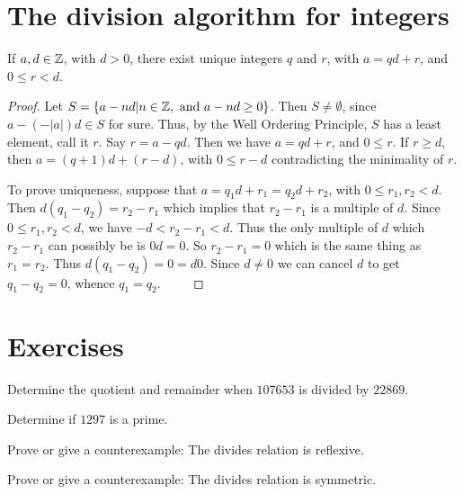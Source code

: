 \section{The division algorithm for integers}
\begin{thm} 
If $a,d\in \mathbb{Z}$, with $d>0$, there exist
unique integers $q$ and $r$, with $a=qd+r$, and $0\leq r<d$.

\end{thm}
\begin{proof}
Let $S=\{a-nd|n\in \mathbb{Z}, {\rm {~and~}} a-nd \geq 0\}$. Then $S\neq \emptyset$, since $a-(-|a|)d\in S$ for sure.
Thus, by the Well Ordering Principle, $S$ has a least element, call it $r$. Say $r=a-qd$. Then 
we have $a=qd+r$, and $0\leq r$. If $r\geq d$, then $a=(q+1)d+(r-d)$, with $0\leq r-d$ contradicting
the minimality of $r$. 

To prove uniqueness, suppose that $a=q_1d+r_1=q_2d+r_2$, with $0\leq r_1,r_2<d$. Then 
$d(q_1-q_2)=r_2-r_1$ which implies that $r_2-r_1$ is a multiple of $d$. Since $0\leq r_1,r_2<d$,
we have $-d<r_2-r_1<d$. Thus the only multiple of $d$ which $r_2-r_1$ can possibly be is $0d=0$.
So $r_2-r_1=0$ which is the same thing as $r_1=r_2$. Thus $d(q_1-q_2)=0=d0$. Since $d\neq 0$ we
can cancel $d$ to get $q_1-q_2=0$, whence $q_1=q_2$.$\quad$ $\;$\
\end{proof}


\clearpage

\section{Exercises}

\begin{exer}
  Determine the quotient and remainder when $107653$ is
divided by $22869$.
\end{exer}

\begin{exer}
Determine if $1297$ is a prime.
\end{exer}

\begin{exer}
Prove or give a counterexample: The divides relation is reflexive.
\end{exer}

\begin{exer}
Prove or give a counterexample: The divides relation is symmetric.
\end{exer}


